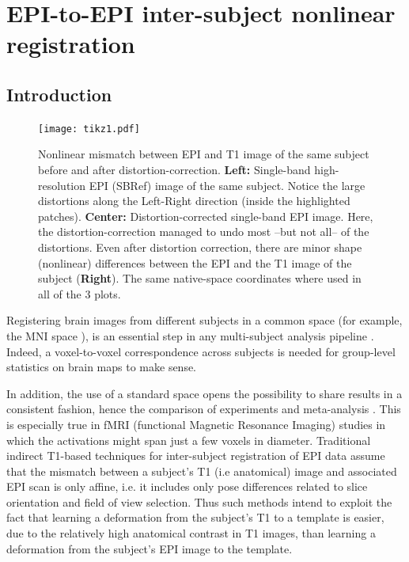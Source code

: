 \chapter{EPI-to-EPI inter-subject nonlinear registration}\label{chap:epi2epi}
\section{Introduction}
\begin{figure}[!htbp]
     \texttt{[image: tikz1.pdf]}
\caption{Nonlinear mismatch between EPI and T1 image of
  the same subject before and after distortion-correction.
\textbf{Left:} Single-band high-resolution EPI (SBRef) image of the
same subject. Notice the large distortions along the Left-Right direction
(inside the highlighted patches). \textbf{Center:} Distortion-corrected
single-band EPI image. Here, the distortion-correction managed to undo
most --but not all-- of the distortions. Even after distortion
correction, there are minor shape (nonlinear) differences between the
EPI and the T1 image of the subject (\textbf{Right}). The same native-space
coordinates where used in all of the 3 plots.}
\label{fig:pb_fig}
\end{figure}
Registering brain images from different subjects in a common space
(for example, the MNI space \citep{pmid8126267,pmid9343592}), is an
essential step in any multi-subject analysis pipeline \citep{FristonBook}. Indeed, a
voxel-to-voxel correspondence across subjects is needed for
group-level statistics on brain maps to make sense.

In addition, the use of a standard space opens the possibility to share
results in a consistent fashion, hence the comparison of experiments
and meta-analysis \citep{pmid18985131,pmid25914639}.
This is especially true in fMRI (functional Magnetic Resonance Imaging)
studies in which the activations might span just a few voxels in diameter.
Traditional indirect T1-based techniques for inter-subject
registration of EPI data assume that the mismatch between a subject's
T1 (i.e anatomical) image and associated EPI scan is only affine,
i.e. it includes only pose differences related to slice orientation
and field of view selection. Thus such methods intend to exploit the
fact that learning a deformation from the subject's T1 to a template
is easier, due to the relatively high anatomical contrast in T1
images, than learning a deformation from the subject's EPI image to the
template.

